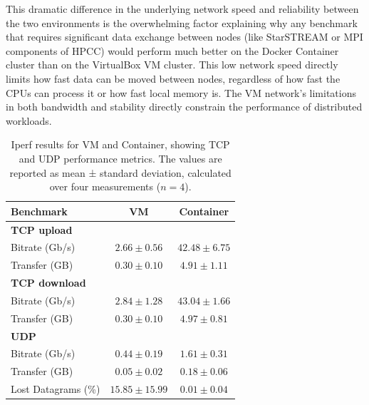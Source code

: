This dramatic difference in the underlying network speed and reliability between the two environments is the overwhelming factor explaining why any benchmark that requires significant data exchange between nodes (like StarSTREAM or MPI components of HPCC) would perform much better on the Docker Container cluster than on the VirtualBox VM cluster. This low network speed directly limits how fast data can be moved between nodes, regardless of how fast the CPUs can process it or how fast local memory is. The VM network's limitations in both bandwidth and stability directly constrain the performance of distributed workloads.

\begin{table}[H]
    \centering
    \begin{tabular}{lcc}
    \toprule
    \textbf{Benchmark} & \textbf{VM} & \textbf{Container} \\
    \midrule
    \textbf{TCP upload} & & \\
    Bitrate (Gb/s) & $2.66 \pm 0.56$ & $42.48 \pm 6.75$ \\
    Transfer (GB) & $0.30 \pm 0.10$ & $4.91 \pm 1.11$ \\
    \midrule
    \textbf{TCP download} & & \\
    Bitrate (Gb/s) & $2.84 \pm 1.28$ & $43.04 \pm 1.66$ \\
    Transfer (GB) & $0.30 \pm 0.10$ & $4.97 \pm 0.81$ \\
    \midrule
    \textbf{UDP} & & \\
    Bitrate (Gb/s) & $0.44 \pm 0.19$ & $1.61 \pm 0.31$ \\
    Transfer (GB) & $0.05 \pm 0.02$ & $0.18 \pm 0.06$ \\
    Lost Datagrams (\%) & $15.85 \pm 15.99$ & $0.01 \pm 0.04$ \\
    \bottomrule
    \end{tabular}
    \caption{Iperf results for VM and Container, showing TCP and UDP performance metrics. The values are reported as mean ± standard deviation, calculated over four measurements ($n = 4$).}
    \label{tab:iperf}
\end{table}